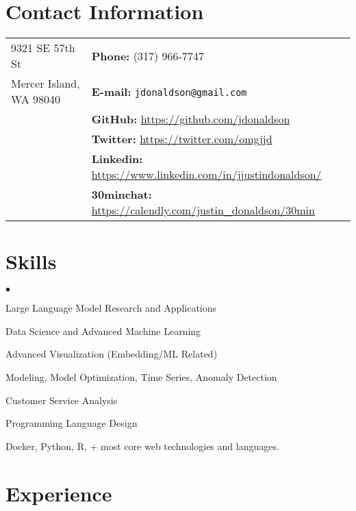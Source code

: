 \documentclass[margin,line]{res}
\newenvironment{list2}{
  \begin{list}{$\bullet$}{%
      \setlength{\itemsep}{0in}
      \setlength{\parsep}{0in} \setlength{\parskip}{0in}
      \setlength{\topsep}{0in} \setlength{\partopsep}{0in} 
      \setlength{\leftmargin}{0.2in}}}{\end{list}}
\begin{document}
\address{\large ML/DS/Engineering Entrepeneur}
\address{\large Above Ventures, LLC}

\begin{resume}
\section{\sc Contact Information}
\vspace{.05in}
\begin{tabular}{@{}p{2in}p{4in}}
9321 SE 57th St          & {\bf Phone:}   (317) 966-7747 \\
Mercer Island, WA 98040  & {\bf E-mail:}  {\tt jdonaldson@gmail.com} \\
                         & {\bf GitHub:} \url{https://github.com/jdonaldson} \\
                         & {\bf Twitter:} \url{https://twitter.com/omgjjd} \\
                         & {\bf Linkedin:} \url{https://www.linkedin.com/in/jjustindonaldson/} \\
                         & {\bf 30minchat:} \url{https://calendly.com/justin_donaldson/30min} \\

\end{tabular}


\section{\sc Skills}
\begin{list2}
\item Large Language Model Research and Applications
\item Data Science and Advanced Machine Learning
\item Advanced Visualization (Embedding/ML Related)
\item Modeling, Model Optimization, Time Series, Anomaly Detection
\item Customer Service Analysis
\item Programming Language Design
\item Docker, Python, R, + most core web technologies and languages.
\end{list2}

\section{\sc Experience}


\end{resume}
\end{document}
